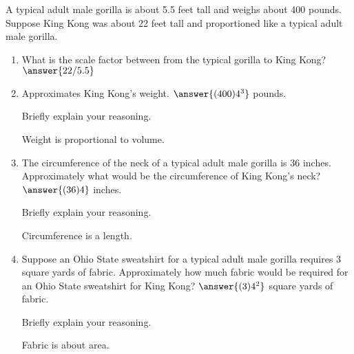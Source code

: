 \documentclass[nooutcomes]{ximera}
\begin{document}
\begin{problem}
A typical adult male gorilla is about 5.5 feet tall and weighs about 400 pounds. Suppose King Kong was about 22 feet tall and proportioned like a typical adult male gorilla.
\begin{enumerate}
\item What is the scale factor between from the typical gorilla to King Kong?  $\answer{22/5.5}$
\item Approximates King Kong's weight. $\answer{(400)4^3}$  pounds.

Briefly explain your reasoning.  \begin{hint}Weight is proportional to volume.\end{hint}
\item The circumference of the neck of a typical adult male gorilla is 36 inches. Approximately what would be the circumference of King Kong's neck? $\answer{(36)4}$ inches. 

Briefly explain your reasoning.  \begin{hint}Circumference is a length.\end{hint}
\item Suppose an Ohio State sweatshirt for a typical adult male gorilla requires 3 square yards of fabric.  Approximately how much fabric would be required for an Ohio State sweatshirt for King Kong?  $\answer{(3)4^2}$ square yards of fabric. 

Briefly explain your reasoning.  \begin{hint}Fabric is about area.\end{hint}
\end{enumerate}
\end{problem}
\end{document}
